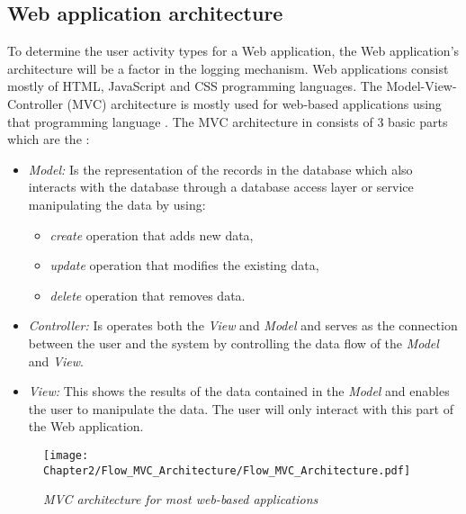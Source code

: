 \subsection{Web application architecture}\label{sec:ch2:webApplicationArchitecture}
To determine the user activity types for a Web application, the Web application's architecture will be a factor in the logging mechanism. Web applications consist mostly of HTML, JavaScript and CSS programming languages. The Model-View-Controller (MVC) architecture is mostly used for web-based applications using that programming language \cite{Jailia2016}. The MVC architecture in  consists of 3 basic parts which are the \cite{Jailia2016}:

\begin{itemize}
	\item \textit{Model:} Is the representation of the records in the database which also interacts with the database through a database access layer or service manipulating the data by using:
	\begin{itemize}
		\item \textit{create} operation that adds new data,
		\item \textit{update} operation that modifies the existing data,
		\item \textit{delete} operation that removes data.
	\end{itemize}
	\item \textit{Controller:} Is operates both the \textit{View} and \textit{Model} and serves as the connection between the user and the system by controlling the data flow of the \textit{Model} and
	\textit{View}.
	\item \textit{View:} This shows the results of the data contained in the \textit{Model} and enables the user to manipulate the data. The user will only interact with this part of the Web application.
\end{itemize}

\begin{figure}[!htb] %
	\centering %
	\texttt{[image: Chapter2/Flow\_MVC\_Architecture/Flow\_MVC\_Architecture.pdf]}
	\caption[MVC architecture for most web-based applications]
	{\textit{MVC architecture for most web-based applications \cite{Gu2010}}}\label{fig:ch2_flowMVC_Architecture}
\end{figure}

